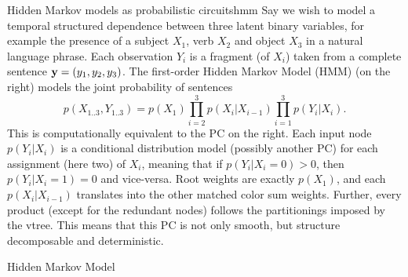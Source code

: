 \begin{example}[sidebyside,lefthand width=0.55\textwidth]{Hidden Markov models as probabilistic circuits}{hmm}
  Say we wish to model a temporal structured dependence between three latent binary variables, for
  example the presence of a subject $X_1$, verb $X_2$ and object $X_3$ in a natural language
  phrase. Each observation $Y_i$ is a fragment (of $X_i$) taken from a complete sentence
  $\mathbf{y}=(y_1,y_2,y_3)$. The first-order Hidden Markov Model (HMM) (on the right) models the
  joint probability of sentences
  \begin{equation*}
    p(X_{1..3},Y_{1..3})=p(X_1)\prod_{i=2}^3 p(X_i|X_{i-1})\prod_{i=1}^3 p(Y_i|X_i).
  \end{equation*}
  This is computationally equivalent to the PC on the right. Each input node $p(Y_i|X_i)$ is a
  conditional distribution model (possibly another PC) for each assignment (here two) of $X_i$,
  meaning that if $p(Y_i|X_i=0)>0$, then $p(Y_i|X_i=1)=0$ and vice-versa. Root weights are exactly
  $p(X_1)$, and each $p(X_i|X_{i-1})$ translates into the other matched color sum weights. Further,
  every product (except for the redundant \inode[fill=boxgray!80]{\newProdNode} nodes) follows the
  partitionings imposed by the vtree. This means that this PC is not only smooth, but structure
  decomposable and deterministic.
  \tcblower
  \begin{center}

    \vskip -0.25cm
    \small%
    Hidden Markov Model


\end{center}
\end{example}
